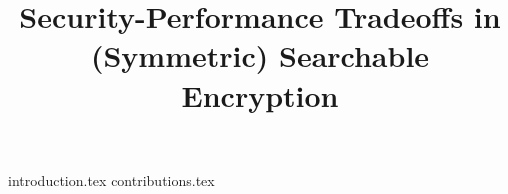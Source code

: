\documentclass[letterpaper,twocolumn,10pt]{article}
\begin{document}
	
	\title{Security-Performance Tradeoffs in (Symmetric) Searchable Encryption}
	
	\iftoggle{anon}{
		\author{
		\alignauthor
		Anonymous submission
		}
	}{
	\author{Raphael Bost\thanks{Direction Générale de l'Armement - Maîtrise de l'Information \& Université de Rennes 1, France. The views and conclusions contained herein are those of the author and should not be interpreted as necessarily representing the official policies or endorsements, either expressed or implied, of the DGA or the French Government.
	email: \href{mailto:raphael_bost@alumni.brown.edu}{\nolinkurl{raphael_bost@alumni.brown.edu}}
	}
	\and
	Pierre-Alain Fouque\thanks{Université de Rennes 1.
	email: \href{mailto:pierre-alain.fouque@ens.fr}{\nolinkurl{pierre-alain.fouque@ens.fr}}}
	\and 
	David Pointcheval\thanks{Ecole Normale Supérieure.
	email: \href{mailto:david.pointcheval@ens.fr}{\nolinkurl{david.pointcheval@ens.fr}}}
	}
	
	}	
	
	\date{}
	
	\maketitle 
	
	{introduction.tex}
	{contributions.tex}
	
	
	
	
\end{document}
